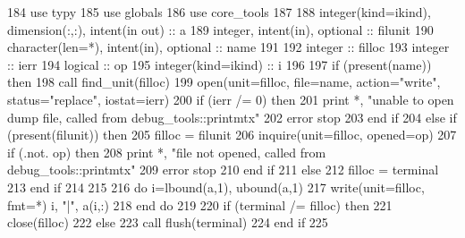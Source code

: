 \begin{DoxyCode}
184       \textcolor{keywordtype}{use }typy
185       \textcolor{keywordtype}{use }globals
186       \textcolor{keywordtype}{use }core_tools
187       
188       \textcolor{keywordtype}{integer(kind=ikind)}, \textcolor{keywordtype}{dimension(:,:)}, \textcolor{keywordtype}{intent(in out)} :: a
189       \textcolor{keywordtype}{integer}, \textcolor{keywordtype}{intent(in)}, \textcolor{keywordtype}{optional} :: filunit   
190       \textcolor{keywordtype}{character(len=*)}, \textcolor{keywordtype}{intent(in)}, \textcolor{keywordtype}{optional} :: name
191 
192       \textcolor{keywordtype}{integer} :: filloc
193       \textcolor{keywordtype}{integer} :: ierr
194       \textcolor{keywordtype}{logical} :: op
195       \textcolor{keywordtype}{integer(kind=ikind)} :: i
196       
197       \textcolor{keywordflow}{if} (\textcolor{keyword}{present}(name)) \textcolor{keywordflow}{then}
198         \textcolor{keyword}{call }find_unit(filloc)
199         \textcolor{keyword}{open}(unit=filloc, file=name, action=\textcolor{stringliteral}{"write"}, status=\textcolor{stringliteral}{"replace"}, iostat\textcolor{comment}{=ierr)}
200 \textcolor{comment}{        }\textcolor{keywordflow}{if} (ierr /= 0) \textcolor{keywordflow}{then}
201           print *, \textcolor{stringliteral}{"unable to open dump file, called from debug\_tools::printmtx"}
202           error stop
203 \textcolor{keywordflow}{        end if}
204       \textcolor{keywordflow}{else} \textcolor{keywordflow}{if} (\textcolor{keyword}{present}(filunit)) \textcolor{keywordflow}{then}
205         filloc = filunit
206         \textcolor{keyword}{inquire}(unit=filloc, opened=op)
207         \textcolor{keywordflow}{if} (.not. op) \textcolor{keywordflow}{then}
208           print *, \textcolor{stringliteral}{"file not opened, called from debug\_tools::printmtx"}
209           error stop
210 \textcolor{keywordflow}{        end if}
211       \textcolor{keywordflow}{else}
212         filloc = terminal
213 \textcolor{keywordflow}{      end if}
214       
215       
216       \textcolor{keywordflow}{do} i=lbound(a,1), ubound(a,1)
217         \textcolor{keyword}{write}(unit=filloc, fmt=*)  i, \textcolor{stringliteral}{"|"},  a(i,:)
218 \textcolor{keywordflow}{      end do}
219 
220       \textcolor{keywordflow}{if} (terminal /= filloc) \textcolor{keywordflow}{then}
221         \textcolor{keyword}{close}(filloc)
222       \textcolor{keywordflow}{else}
223         \textcolor{keyword}{call }flush(terminal)
224 \textcolor{keywordflow}{      end if}
225       
\end{DoxyCode}
